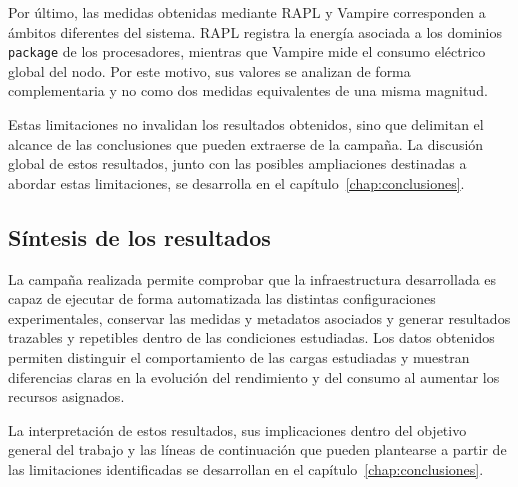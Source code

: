Por último, las medidas obtenidas mediante RAPL y Vampire corresponden a ámbitos diferentes del sistema. RAPL registra la energía asociada a los dominios \texttt{package} de los procesadores, mientras que Vampire mide el consumo eléctrico global del nodo. Por este motivo, sus valores se analizan de forma complementaria y no como dos medidas equivalentes de una misma magnitud.

Estas limitaciones no invalidan los resultados obtenidos, sino que delimitan el alcance de las conclusiones que pueden extraerse de la campaña. La discusión global de estos resultados, junto con las posibles ampliaciones destinadas a abordar estas limitaciones, se desarrolla en el capítulo~\ref{chap:conclusiones}.

\subsection{Síntesis de los resultados}
\label{sec:sintesis-cap6}

La campaña realizada permite comprobar que la infraestructura desarrollada es capaz de ejecutar de forma automatizada las distintas configuraciones experimentales, conservar las medidas y metadatos asociados y generar resultados trazables y repetibles dentro de las condiciones estudiadas. Los datos obtenidos permiten distinguir el comportamiento de las cargas estudiadas y muestran diferencias claras en la evolución del rendimiento y del consumo al aumentar los recursos asignados.

La interpretación de estos resultados, sus implicaciones dentro del objetivo general del trabajo y las líneas de continuación que pueden plantearse a partir de las limitaciones identificadas se desarrollan en el capítulo~\ref{chap:conclusiones}.
